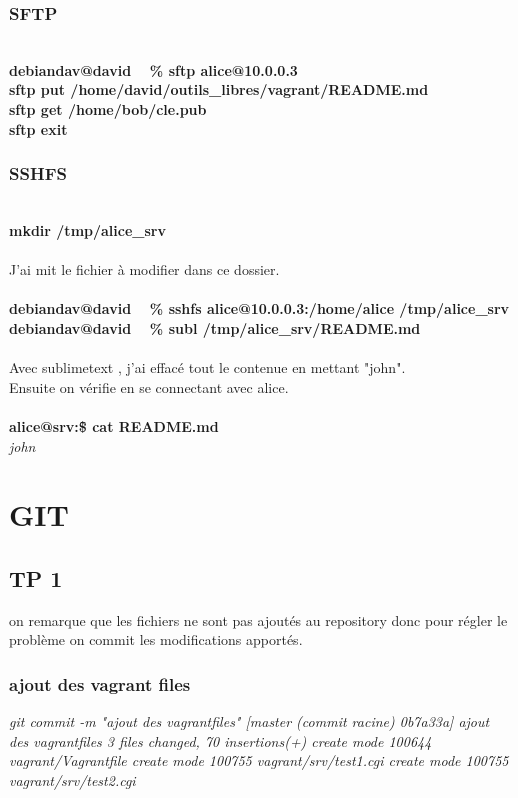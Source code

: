 \documentclass{report}
\begin{document}
\subsection{SFTP}
\\
\textbf{debiandav@david ~ \% sftp alice@10.0.0.3} \\
\textbf{sftp\> put /home/david/outils\_libres/vagrant/README.md} \\
\textbf{sftp\> get /home/bob/cle.pub} \\
\textbf{sftp\> exit} \\

\subsection{SSHFS}
\\
\textbf{mkdir /tmp/alice\_srv} \\
\\
J'ai mit le fichier à modifier dans ce dossier. \\
\\
\textbf{debiandav@david ~ \% sshfs alice@10.0.0.3:/home/alice /tmp/alice\_srv} \\
\textbf{debiandav@david ~ \% subl /tmp/alice\_srv/README.md} \\
\\
Avec sublimetext , j'ai effacé tout le contenue en mettant "john". \\
Ensuite on vérifie en se connectant avec alice. \\
\\
\textbf{alice@srv:\~\$ cat README.md} \\
\textit{john} \\

\chapter{GIT}

\section{TP 1}
on remarque que les fichiers ne sont pas ajoutés au repository donc pour régler le problème 
on commit les modifications apportés.

\subsection{ajout des vagrant files}
\textit{git commit -m "ajout des vagrantfiles"
[master (commit racine) 0b7a33a] ajout des vagrantfiles
 3 files changed, 70 insertions(+)
 create mode 100644 vagrant/Vagrantfile
 create mode 100755 vagrant/srv/test1.cgi
 create mode 100755 vagrant/srv/test2.cgi}
\end{document}
